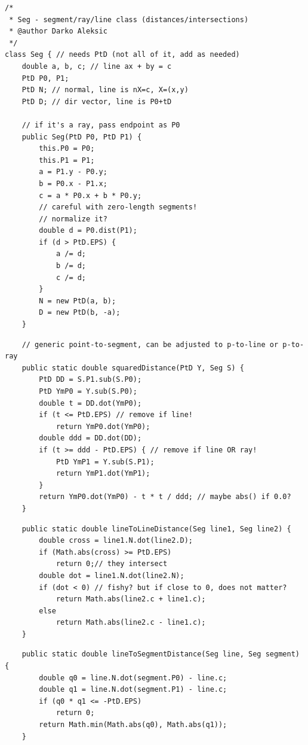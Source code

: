 \documentclass{article}
\begin{document}
    \begin{verbatim}
/*
 * Seg - segment/ray/line class (distances/intersections)
 * @author Darko Aleksic
 */
class Seg { // needs PtD (not all of it, add as needed)
    double a, b, c; // line ax + by = c
    PtD P0, P1;
    PtD N; // normal, line is nX=c, X=(x,y)
    PtD D; // dir vector, line is P0+tD

    // if it's a ray, pass endpoint as P0
    public Seg(PtD P0, PtD P1) {
        this.P0 = P0;
        this.P1 = P1;
        a = P1.y - P0.y;
        b = P0.x - P1.x;
        c = a * P0.x + b * P0.y;
        // careful with zero-length segments!
        // normalize it?
        double d = P0.dist(P1);
        if (d > PtD.EPS) {
            a /= d;
            b /= d;
            c /= d;
        }
        N = new PtD(a, b);
        D = new PtD(b, -a);
    }

    \end{verbatim}
    \begin{verbatim}
    // generic point-to-segment, can be adjusted to p-to-line or p-to-ray
    public static double squaredDistance(PtD Y, Seg S) {
        PtD DD = S.P1.sub(S.P0);
        PtD YmP0 = Y.sub(S.P0);
        double t = DD.dot(YmP0);
        if (t <= PtD.EPS) // remove if line!
            return YmP0.dot(YmP0);
        double ddd = DD.dot(DD);
        if (t >= ddd - PtD.EPS) { // remove if line OR ray!
            PtD YmP1 = Y.sub(S.P1);
            return YmP1.dot(YmP1);
        }
        return YmP0.dot(YmP0) - t * t / ddd; // maybe abs() if 0.0?
    }

    \end{verbatim}
    \begin{verbatim}
    public static double lineToLineDistance(Seg line1, Seg line2) {
        double cross = line1.N.dot(line2.D);
        if (Math.abs(cross) >= PtD.EPS)
            return 0;// they intersect
        double dot = line1.N.dot(line2.N);
        if (dot < 0) // fishy? but if close to 0, does not matter?
            return Math.abs(line2.c + line1.c);
        else
            return Math.abs(line2.c - line1.c);
    }

    \end{verbatim}
    \begin{verbatim}
    public static double lineToSegmentDistance(Seg line, Seg segment) {
        double q0 = line.N.dot(segment.P0) - line.c;
        double q1 = line.N.dot(segment.P1) - line.c;
        if (q0 * q1 <= -PtD.EPS)
            return 0;
        return Math.min(Math.abs(q0), Math.abs(q1));
    }

    \end{verbatim}
\end{document}
